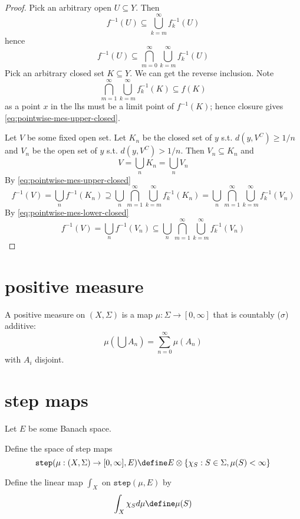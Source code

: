 \documentclass{scrartcl}
\begin{document}
\begin{proof}
  Pick an arbitrary open $U\subseteq Y$. Then 
  \[
  f^{-1}(U) \subseteq \bigcup_{k=m}^\infty f_k^{-1}(U)
  \]
  hence 
  \begin{equation}
  f^{-1}(U) \subseteq \bigcap_{m=0}^\infty \bigcup_{k=m}^\infty f_k^{-1}(U)
  \label{eq:pointwise-mes-lower-closed}
  \end{equation}
  Pick an arbitrary closed set $K\subseteq Y$. We can get the reverse inclusion. Note
  \begin{equation}
  \bigcap_{m=1}^\infty \bigcup_{k=m}^\infty f_k^{-1}(K)\subseteq f(K)
  \label{eq:pointwise-mes-upper-closed}
  \end{equation}
  as a point $x$ in the lhs must be a limit point of $f^{-1}(K)$; hence closure gives \cref{eq:pointwise-mes-upper-closed}.
  
  Let $V$ be some fixed open set. Let $K_n$ be the closed set of $y$ s.t. $d(y,V^C)\geq 1/n$ and $V_n$ be the open set of $y$ s.t. $d(y,V^C)>1/n$. Then $V_n \subseteq K_n$ and 
  \[
  V=\bigcup_n K_n=\bigcup_n V_n
  \]
  By \cref{eq:pointwise-mes-upper-closed}
  \[
  f^{-1}(V)=\bigcup_n f^{-1}(K_n)\supseteq \bigcup_n \bigcap_{m=1}^\infty \bigcup_{k=m}^\infty f^{-1}_k(K_n)=\bigcup_n \bigcap_{m=1}^\infty \bigcup_{k=m}^\infty f^{-1}_k(V_n)
  \]
  By \cref{eq:pointwise-mes-lower-closed}
  \[
  f^{-1}(V)=\bigcup_n f^{-1}(V_n)\subseteq \bigcup_n \bigcap_{m=1}^\infty \bigcup_{k=m}^\infty f^{-1}_k(V_n)
  \]
\end{proof}
\section{positive measure}
\begin{defn}
  A positive measure on $(X,\Sigma)$ is a map $\mu:\Sigma\to [0,\infty]$ that is countably ($\sigma$) additive:
  \[
  \mu\left(\bigcup A_n\right)=\sum_{n=0}^\infty \mu(A_n) 
  \]
  with $A_i$ disjoint. 
\end{defn}
\section{step maps}
Let $E$ be some Banach space. 
\newcommand{\step}{\mathtt{step}}
\begin{defn}
Define the space of step maps
  \[
  \step(\mu:(X,\Sigma)\to[0,\infty],E)\define E\otimes\{\chi_S:S\in\Sigma, \mu(S)<\infty\}
  \]
\end{defn}

\begin{defn}
  Define the linear map $\int_X$ on $\step(\mu,E)$ by
  \[
  \int_X \chi_S d\mu \define\mu(S)
  \]
\end{defn}
\end{document}
